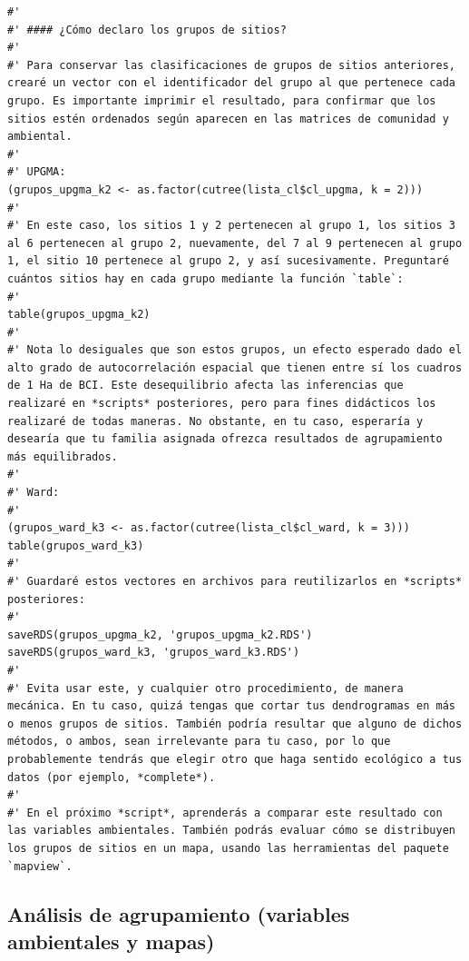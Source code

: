 \documentclass[11pt,]{article}
\begin{document}
\begin{verbatim}
#' 
#' #### ¿Cómo declaro los grupos de sitios?
#' 
#' Para conservar las clasificaciones de grupos de sitios anteriores, crearé un vector con el identificador del grupo al que pertenece cada grupo. Es importante imprimir el resultado, para confirmar que los sitios estén ordenados según aparecen en las matrices de comunidad y ambiental.
#' 
#' UPGMA:
(grupos_upgma_k2 <- as.factor(cutree(lista_cl$cl_upgma, k = 2)))
#' 
#' En este caso, los sitios 1 y 2 pertenecen al grupo 1, los sitios 3 al 6 pertenecen al grupo 2, nuevamente, del 7 al 9 pertenecen al grupo 1, el sitio 10 pertenece al grupo 2, y así sucesivamente. Preguntaré cuántos sitios hay en cada grupo mediante la función `table`:
#' 
table(grupos_upgma_k2)
#' 
#' Nota lo desiguales que son estos grupos, un efecto esperado dado el alto grado de autocorrelación espacial que tienen entre sí los cuadros de 1 Ha de BCI. Este desequilibrio afecta las inferencias que realizaré en *scripts* posteriores, pero para fines didácticos los realizaré de todas maneras. No obstante, en tu caso, esperaría y desearía que tu familia asignada ofrezca resultados de agrupamiento más equilibrados.
#' 
#' Ward:
#' 
(grupos_ward_k3 <- as.factor(cutree(lista_cl$cl_ward, k = 3)))
table(grupos_ward_k3)
#'
#' Guardaré estos vectores en archivos para reutilizarlos en *scripts* posteriores:
#' 
saveRDS(grupos_upgma_k2, 'grupos_upgma_k2.RDS')
saveRDS(grupos_ward_k3, 'grupos_ward_k3.RDS')
#' 
#' Evita usar este, y cualquier otro procedimiento, de manera mecánica. En tu caso, quizá tengas que cortar tus dendrogramas en más o menos grupos de sitios. También podría resultar que alguno de dichos métodos, o ambos, sean irrelevante para tu caso, por lo que probablemente tendrás que elegir otro que haga sentido ecológico a tus datos (por ejemplo, *complete*).
#' 
#' En el próximo *script*, aprenderás a comparar este resultado con las variables ambientales. También podrás evaluar cómo se distribuyen los grupos de sitios en un mapa, usando las herramientas del paquete `mapview`.
\end{verbatim}

\subsection{Análisis de agrupamiento (variables ambientales y
mapas)}\label{anuxe1lisis-de-agrupamiento-variables-ambientales-y-mapas}
\end{document}
